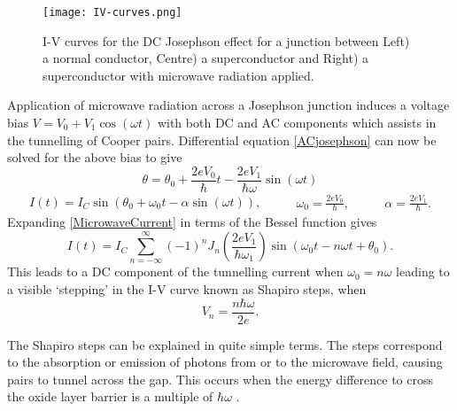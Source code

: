 \documentclass[11pt]{article}
\begin{document}
\begin{figure}[H]
	\centering
	\texttt{[image: IV-curves.png]}
	\caption{I-V curves for the DC Josephson effect for a junction between Left) a normal conductor, Centre) a superconductor and Right) a superconductor with microwave radiation applied.}
	\label{IV-curves}
\end{figure}

Application of microwave radiation across a Josephson junction induces a voltage bias $V = V_0 + V_1 \cos(\omega t)$ with both DC and AC components which assists in the tunnelling of Cooper pairs. Differential equation \ref{ACjosephson} can now be solved for the above bias to give
\begin{equation}
	\label{MicrowavePhase}
	\theta = \theta_0 + \frac{2eV_0}{\hbar}t - \frac{2eV_1}{\hbar\omega}\sin(\omega t)
\end{equation}
\begin{equation}
	\label{MicrowaveCurrent}
	\begin{split}
		I(t) = I_C \sin(\theta_0 + \omega_0 t - \alpha\sin(\omega t)),
	\end{split}
	\quad\quad
	\begin{split}
		\omega_0 = \frac{2eV_0}{\hbar},
	\end{split}
	\quad\quad
	\begin{split}
		\alpha = \frac{2eV_1}{\hbar}.
	\end{split}
\end{equation}
Expanding \ref{MicrowaveCurrent} in terms of the Bessel function gives
\begin{equation}
	\label{MicrowaveCurrentBessel}
	I(t) = I_C \sum_{n=-\infty}^{\infty} (-1)^n J_n \left(\frac{2eV_1}{\hbar\omega_1}\right) \sin(\omega_0 t - n\omega t + \theta_0).
\end{equation}
This leads to a DC component of the tunnelling current when $\omega_0 = n\omega$ leading to a visible `stepping' in the I-V curve known as Shapiro steps, when
\begin{equation}
	\label{StepVoltage}
	V_n = \frac{n\hbar \omega}{2e}.
\end{equation}

The Shapiro steps can be explained in quite simple terms. The steps correspond to the absorption or emission of photons from or to the microwave field, causing pairs to tunnel across the gap. This occurs when the energy difference to cross the oxide layer barrier is a multiple of $\hbar \omega$ \cite{clarke}.
\end{document}

